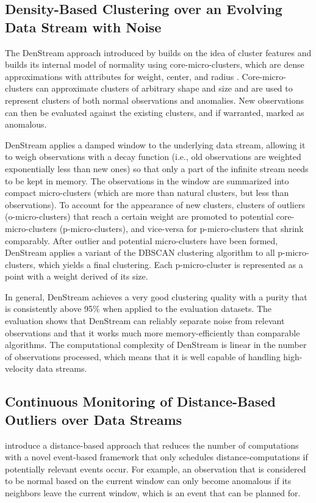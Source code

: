 \subsection{Density-Based Clustering over an Evolving Data Stream with Noise \citep{cao_density-based_2006}}
The DenStream approach introduced by \citet{cao_density-based_2006} builds on the idea of cluster features and builds its internal model of normality using core-micro-clusters, which are dense approximations with attributes for weight, center, and radius \citep{miller_twitter_2014}. Core-micro-clusters can approximate clusters of arbitrary shape and size and are used to represent clusters of both normal observations and anomalies. New observations can then be evaluated against the existing clusters, and if warranted, marked as anomalous.

DenStream applies a damped window to the underlying data stream, allowing it to weigh observations with a decay function (i.e., old observations are weighted exponentially less than new ones) so that only a part of the infinite stream needs to be kept in memory. The observations in the window are summarized into compact micro-clusters (which are more than natural clusters, but less than observations). To account for the appearance of new clusters, clusters of outliers (o-micro-clusters) that reach a certain weight are promoted to potential core-micro-clusters (p-micro-clusters), and vice-versa for p-micro-clusters that shrink comparably. After outlier and potential micro-clusters have been formed, DenStream applies a variant of the DBSCAN clustering algorithm to all p-micro-clusters, which yields a final clustering. Each p-micro-cluster is represented as a point with a weight derived of its size.

In general, DenStream achieves a very good clustering quality with a purity that is consistently above 95\% when applied to the evaluation datasets. The evaluation shows that DenStream can reliably separate noise from relevant observations and that it works much more memory-efficiently than comparable algorithms. The computational complexity of DenStream is linear in the number of observations processed, which means that it is well capable of handling high-velocity data streams.


\subsection{Continuous Monitoring of Distance-Based Outliers over Data Streams \citep{kontaki_continuous_2011}}
\citet{kontaki_continuous_2011} introduce a distance-based approach that reduces the number of computations with a novel event-based framework that only schedules distance-computations if potentially relevant events occur. For example, an observation that is considered to be normal based on the current window can only become anomalous if its neighbors leave the current window, which is an event that can be planned for.

